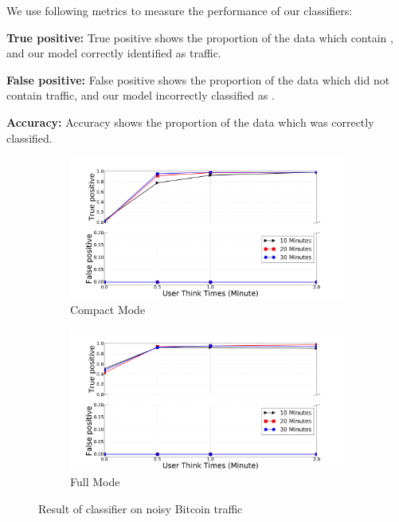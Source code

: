 We use following metrics to measure the performance of our classifiers:
\begin{compactitem}
\item \textbf{True positive:} True positive shows the proportion of the data which contain \bc, and our model correctly identified as \bc traffic.
\item \textbf{False positive:} False positive shows the proportion of the data which did  not contain \bc traffic, and our model incorrectly classified as \bc.
\item \textbf{Accuracy:} Accuracy shows the proportion of the data which was correctly classified.
\end{compactitem}
\begin{figure}

\begin{subfigure}{0.48\linewidth}
\centering
\includegraphics[width=\linewidth]{image/jan25/cmp_sizeHist.pdf}
\caption{Compact Mode}
\label{fig:vanilla_sizeTor}
\end{subfigure}
\begin{subfigure}{0.48\linewidth}
\centering
\includegraphics[width=\linewidth]{image/jan25/full_sizeHist.pdf}
\caption{Full Mode}
\label{fig:vanilla_d2u}
\end{subfigure}
\caption{Result of  classifier on noisy Bitcoin traffic}
\label{fig:sizeHist_non}
\end{figure} 


